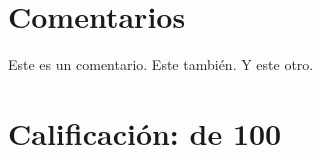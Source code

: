 \documentclass{article}
\begin{document}
\maketitle

\section*{Comentarios}
\begin{enumerate}
     Este es un comentario.
     Este también.
     Y este otro.
\end{enumerate}

\section*{Calificación: \grade de 100}
\end{document}
